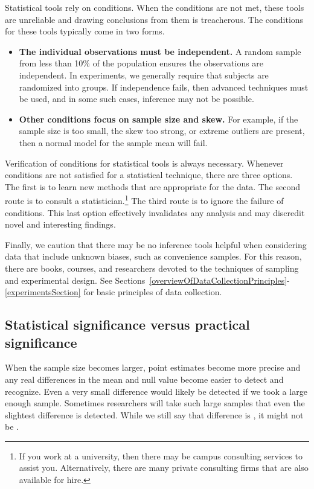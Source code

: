 Statistical tools rely on conditions. When the conditions are not met, these tools are unreliable and drawing conclusions from them is treacherous. The conditions for these tools typically come in two forms.
\begin{itemize}
\setlength{\itemsep}{0mm}
\item \textbf{The individual observations must be independent.} A random sample from less than 10\% of the population ensures the observations are independent. In experiments, we generally require that subjects are randomized into groups. If independence fails, then advanced techniques must be used, and in some such cases, inference may not be possible.
\item \textbf{Other conditions focus on sample size and skew.} For example, if the sample size is too small, the skew too strong, or extreme outliers are present, then a normal model for the sample mean will fail.
\end{itemize}
Verification of conditions for statistical tools is always necessary. Whenever conditions are not satisfied for a statistical technique, there are three options. The first is to learn new methods that are appropriate for the data. The second route is to consult a statistician.\footnote{If you work at a university, then there may be campus consulting services to assist you. Alternatively, there are many private consulting firms that are also available for hire.} The third route is to ignore the failure of conditions. This last option effectively invalidates any analysis and may discredit novel and interesting findings.

Finally, we caution that there may be no inference tools helpful when considering data that include unknown biases, such as convenience samples. For this reason, there are books, courses, and researchers devoted to the techniques of sampling and experimental design. See Sections~\ref{overviewOfDataCollectionPrinciples}-\ref{experimentsSection} for basic principles of data collection.


\subsection{Statistical significance versus practical significance}

When the sample size becomes larger, point estimates become more precise and any real differences in the mean and null value become easier to detect and recognize. Even a very small difference would likely be detected if we took a large enough sample. Sometimes researchers will take such large samples that even the slightest difference is detected. While we still say that difference is , it might not be .


